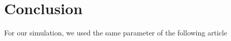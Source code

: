 
\section{Conclusion}
    For our simulation, we used the same parameter of the following article~\cite{}